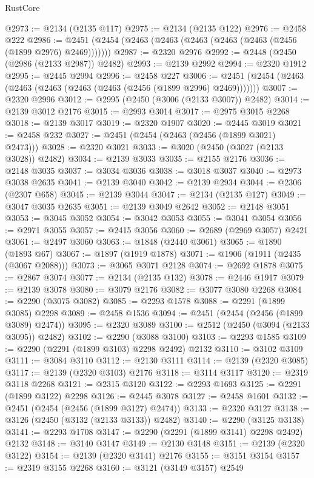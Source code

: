\begin{lexlean}{RustCore}
\begin{coremodule}
@2973 := @2134 (@2135 @117)
@2975 := @2134 (@2135 @122)
@2976 := @2458 @222
@2986 := @2451 (@2454 (@2463 (@2463 (@2463 (@2463 (@2463 (@2456 (@1899 @2976) @2469)))))))
@2987 := @2320 @2976
@2992 := @2448 (@2450 (@2986 (@2133 @2987)) @2482)
@2993 := @2139 @2992
@2994 := @2320 @1912
@2995 := @2445 @2994
@2996 := @2458 @227
@3006 := @2451 (@2454 (@2463 (@2463 (@2463 (@2463 (@2463 (@2456 (@1899 @2996) @2469)))))))
@3007 := @2320 @2996
@3012 := @2995 (@2450 (@3006 (@2133 @3007)) @2482)
@3014 := @2139 @3012 @2176
@3015 := @2993 @3014
@3017 := @2975 @3015 @2268
@3018 := @2139 @3017
@3019 := @2320 @1907
@3020 := @2445 @3019
@3021 := @2458 @232
@3027 := @2451 (@2454 (@2463 (@2456 (@1899 @3021) @2473)))
@3028 := @2320 @3021
@3033 := @3020 (@2450 (@3027 (@2133 @3028)) @2482)
@3034 := @2139 @3033
@3035 := @2155 @2176
@3036 := @2148 @3035
@3037 := @3034 @3036
@3038 := @3018 @3037
@3040 := @2973 @3038 @2635
@3041 := @2139 @3040
@3042 := @2139 @2934
@3044 := @2306 (@2307 @658)
@3045 := @2139 @3044
@3047 := @2134 (@2135 @127)
@3049 := @3047 @3035 @2635
@3051 := @2139 @3049 @2642
@3052 := @2148 @3051
@3053 := @3045 @3052
@3054 := @3042 @3053
@3055 := @3041 @3054
@3056 := @2971 @3055
@3057 := @2415 @3056
@3060 := @2689 (@2969 @3057) @2421
@3061 := @2497 @3060
@3063 := @1848 (@2440 @3061)
@3065 := @1890 (@1893 @67)
@3067 := @1897 (@1919 @1878)
@3071 := @1906 (@1911 (@2435 (@3067 @2088)))
@3073 := @3065 @3071 @2128
@3074 := @2692 @1878
@3075 := @2867 @3074
@3077 := @2134 (@2135 @132)
@3078 := @2446 @1917
@3079 := @2139 @3078
@3080 := @3079 @2176
@3082 := @3077 @3080 @2268
@3084 := @2290 (@3075 @3082)
@3085 := @2293 @1578
@3088 := @2291 (@1899 @3085) @2298
@3089 := @2458 @1536
@3094 := @2451 (@2454 (@2456 (@1899 @3089) @2474))
@3095 := @2320 @3089
@3100 := @2512 (@2450 (@3094 (@2133 @3095)) @2482)
@3102 := @2290 (@3088 @3100)
@3103 := @2293 @1585
@3109 := @2290 (@2291 (@1899 @3103) @2298 @2492) @2132
@3110 := @3102 @3109
@3111 := @3084 @3110
@3112 := @2130 @3111
@3114 := @2139 (@2320 @3085)
@3117 := @2139 (@2320 @3103) @2176
@3118 := @3114 @3117
@3120 := @2319 @3118 @2268
@3121 := @2315 @3120
@3122 := @2293 @1693
@3125 := @2291 (@1899 @3122) @2298
@3126 := @2445 @3078
@3127 := @2458 @1601
@3132 := @2451 (@2454 (@2456 (@1899 @3127) @2474))
@3133 := @2320 @3127
@3138 := @3126 (@2450 (@3132 (@2133 @3133)) @2482)
@3140 := @2290 (@3125 @3138)
@3141 := @2293 @1708
@3147 := @2290 (@2291 (@1899 @3141) @2298 @2492) @2132
@3148 := @3140 @3147
@3149 := @2130 @3148
@3151 := @2139 (@2320 @3122)
@3154 := @2139 (@2320 @3141) @2176
@3155 := @3151 @3154
@3157 := @2319 @3155 @2268
@3160 := @3121 (@3149 @3157) @2549

\end{coremodule}
\end{lexlean}

